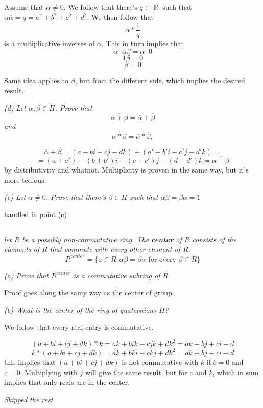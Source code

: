 \documentclass[11pt,oneside,titlepage]{book}
\DeclareMathOperator \real {\mathbb {R}}
\DeclareMathOperator \inv {^{-1}}
\newcommand{\set}[1]{\{ #1 \}}
\begin{document}
Assume that $\alpha \neq 0$. We follow that there's $q \in \real$ such that
$\alpha \overline \alpha = q = a^2 + b^2 + c^2 + d^2$. We then follow that 
$$\overline{\alpha} * \frac{1}{q}$$
is a multiplicative inverses of $\alpha$. This in turn implies that
$$\alpha\inv \alpha \beta = \alpha \inv 0$$
$$1 \beta =  0$$
$$\beta =  0$$

Same idea applies to $\beta$, but from the different side, which implies the desired result.

\textit{(d) Let $\alpha, \beta \in H$. Prove that
  $$\overline{\alpha + \beta} = \overline \alpha + \overline \beta$$
  and
  $$\overline{\alpha * \beta} = \overline \alpha * \overline \beta, $$
}

$$\overline \alpha + \overline \beta = (a - bi - cj - dk) + (a' - b'i - c'j - d'k) = $$
$$= (a + a') - (b + b')i - (c + c')j - (d + d')k =  \overline{\alpha + \beta}$$
by distributivity and whatnot. Multiplicity is proven in the same way,
but it's more tedious.

\textit{(e) Let $\alpha \neq 0$. Prove that there's $\beta \in H$ such
  that $\alpha \beta = \beta \alpha = 1$}

handled in point (c)

\subsection{}

\textit{let $R$ be a possibly non-commutative ring. The
\textbf{center} of $R$ consists of the elements of $R$ that commute
with every other element of $R$.
  $$R^{center} = \set{a \in R: \alpha \beta = \beta \alpha \text{ for every } \beta \in R}$$
}

\textit{(a) Prove that $R^{center}$ is a commutative subring of $R$}

Proof goes along the samy way as the center of group.

\textit{(b) What is the center of the ring of quaternions $H$?}

We follow that every real entry is commutative.

$$(a + bi + cj + dk) * k = ak + bik + cjk + dk^2 = ak - bj + ci - d$$
$$k * (a + bi + cj + dk) = ak + bki + ckj + dk^2 = ak + bj - ci - d$$
this implies that $(a + bi + cj + dk)$ is not commutative with $k$ if
$b = 0$ and $c = 0$. Multiplying with $j$ will give the same result,
but for $c$ and $k$, which in sum implies that only reals are in the
center.

\textit{Skipped the rest}
\end{document}
